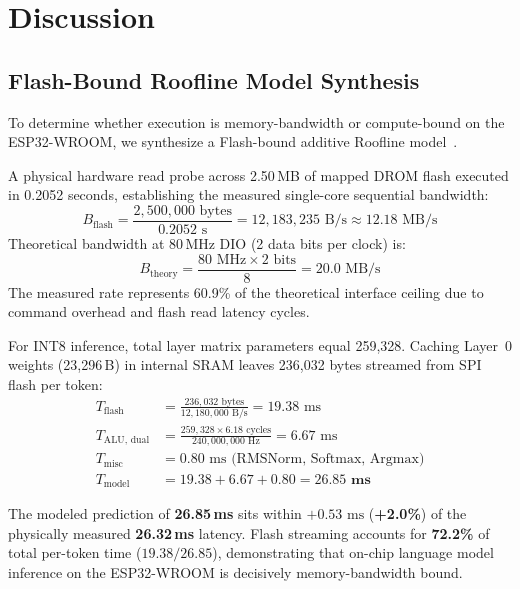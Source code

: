 \documentclass[10pt,a4paper]{article}
\begin{document}
\section{Discussion}
\label{sec:discussion}

\subsection{Flash-Bound Roofline Model Synthesis}
To determine whether execution is memory-bandwidth or compute-bound on the ESP32-WROOM, we synthesize a Flash-bound additive Roofline model~\cite{williams2009roofline}.

A physical hardware read probe across 2.50\,MB of mapped DROM flash executed in 0.2052 seconds, establishing the measured single-core sequential bandwidth:
\begin{equation}
    B_{\text{flash}} = \frac{2,500,000\text{ bytes}}{0.2052\text{ s}} = 12,183,235\text{ B/s} \approx 12.18\text{ MB/s}
\end{equation}
Theoretical bandwidth at 80\,MHz DIO (2 data bits per clock) is:
\begin{equation}
    B_{\text{theory}} = \frac{80\text{ MHz} \times 2\text{ bits}}{8} = 20.0\text{ MB/s}
\end{equation}
The measured rate represents 60.9\% of the theoretical interface ceiling due to command overhead and flash read latency cycles.

For INT8 inference, total layer matrix parameters equal 259,328. Caching Layer~0 weights (23,296\,B) in internal SRAM leaves 236,032 bytes streamed from SPI flash per token:
\begin{align}
    T_{\text{flash}} &= \frac{236,032\text{ bytes}}{12,180,000\text{ B/s}} = 19.38\text{ ms} \\
    T_{\text{ALU, dual}} &= \frac{259,328 \times 6.18\text{ cycles}}{240,000,000\text{ Hz}} = 6.67\text{ ms} \\
    T_{\text{misc}} &= 0.80\text{ ms (RMSNorm, Softmax, Argmax)} \\
    T_{\text{model}} &= 19.38 + 6.67 + 0.80 = \mathbf{26.85\text{ ms}}
\end{align}

The modeled prediction of \textbf{26.85\,ms} sits within $+0.53\text{ ms}$ (\textbf{+2.0\%}) of the physically measured \textbf{26.32\,ms} latency. Flash streaming accounts for \textbf{72.2\%} of total per-token time ($19.38 / 26.85$), demonstrating that on-chip language model inference on the ESP32-WROOM is decisively memory-bandwidth bound.
\end{document}
